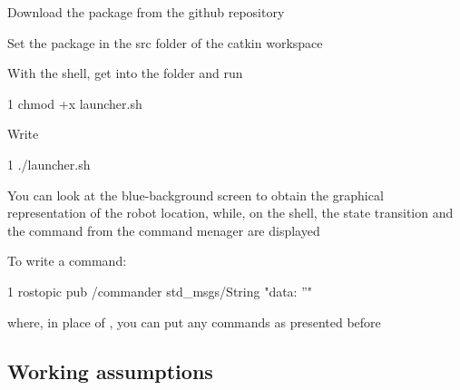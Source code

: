 \begin{DoxyItemize}
\item Download the package from the github repository
\item Set the package in the src folder of the catkin workspace
\item With the shell, get into the folder and run 
\begin{DoxyCode}
1 chmod +x launcher.sh
\end{DoxyCode}

\item Write 
\begin{DoxyCode}
1 ./launcher.sh
\end{DoxyCode}

\item You can look at the blue-\/background screen to obtain the graphical representation of the robot location, while, on the shell, the state transition and the command from the command menager are displayed
\item To write a command\+: 
\begin{DoxyCode}
1 rostopic pub /commander std\_msgs/String "data: ''" 
\end{DoxyCode}
 where, in place of \textquotesingle{}\textquotesingle{}, you can put any commands as presented before
\end{DoxyItemize}

\subsection*{Working assumptions}

